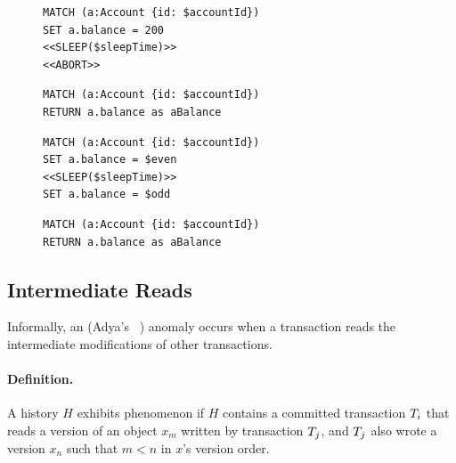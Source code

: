 \begin{figure}[htb]
\centering
\begin{minipage}{0.45\linewidth}
\begin{lstlisting}[language=cypher,label=fig:ar1,caption=\tx{Aborted Read (G1a) $T_\mathrm{W}$}.]
MATCH (a:Account {id: $accountId})
SET a.balance = 200
<<SLEEP($sleepTime)>>
<<ABORT>>
\end{lstlisting}

\begin{lstlisting}[language=cypher,label=fig:ar2,caption=\tx{Aborted Read (G1a) $T_\mathrm{R}$}.]
MATCH (a:Account {id: $accountId})
RETURN a.balance as aBalance
\end{lstlisting}
\end{minipage}
%
\quad
%
\begin{minipage}{0.45\linewidth}
\begin{lstlisting}[language=cypher,label=fig:ir1,caption=\tx{Interm. Read (G1b) $T_\mathrm{W}$}.]
MATCH (a:Account {id: $accountId})
SET a.balance = $even
<<SLEEP($sleepTime)>>
SET a.balance = $odd
\end{lstlisting}

\begin{lstlisting}[language=cypher,label=fig:ir2,caption=\tx{Interm. Read (G1b) $T_\mathrm{R}$}.]
MATCH (a:Account {id: $accountId})
RETURN a.balance as aBalance
\end{lstlisting}
\end{minipage}
\end{figure}

\subsection*{Intermediate Reads}

Informally, an  (Adya's ~\cite{adya1999weak}) 
anomaly occurs when a transaction reads the intermediate modifications of other 
transactions.

\paragraph{Definition.}
A history $H$ exhibits phenomenon  if $H$ contains a committed 
transaction $T_i$ that reads a version of an object $x_m$ written by 
transaction $T_j$, and $T_j$ also wrote a version $x_n$ such that 
$m < n$ in $x$'s version order.

